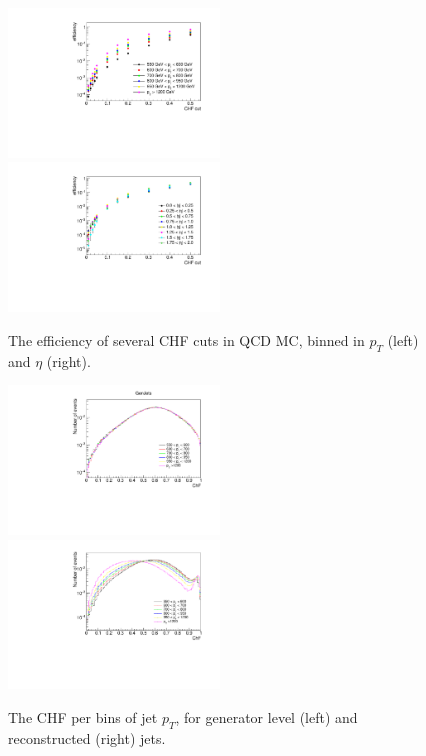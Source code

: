 \begin{figure}[ht]
  \centering
  \includegraphics[width=0.5\textwidth]{figures/eff1D_pt_newtrigger.pdf}\hfill%
  \includegraphics[width=0.5\textwidth]{figures/eff1D_eta_newtrigger.pdf}
  \caption{The efficiency of several CHF cuts in \acs{QCD} MC, binned in $p_T$ (left) and $\eta$ (right).}
  \label{fig:efficiencies}
\end{figure}

\begin{figure}[ht]
  \centering
  \includegraphics[width=0.5\textwidth]{figures/ChFPerPtbin_GenJets.pdf}\hfill%
  \includegraphics[width=0.5\textwidth]{figures/ChFperPtbin.pdf}
  \caption{The CHF per bins of jet $p_T$, for generator level (left) and reconstructed (right) jets.}
  \label{fig:pt_dependence}
\end{figure}

